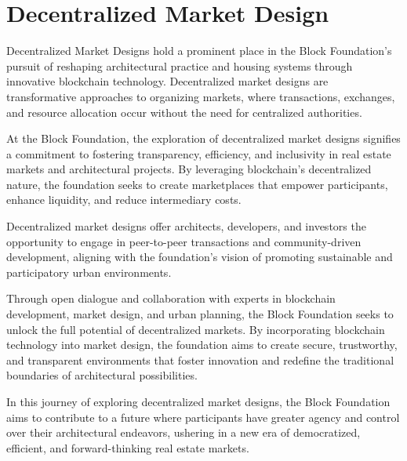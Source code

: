 \section{Decentralized Market Design}


Decentralized Market Designs hold a prominent place in the Block Foundation's pursuit of reshaping architectural practice and housing systems through innovative blockchain technology. Decentralized market designs are transformative approaches to organizing markets, where transactions, exchanges, and resource allocation occur without the need for centralized authorities.

At the Block Foundation, the exploration of decentralized market designs signifies a commitment to fostering transparency, efficiency, and inclusivity in real estate markets and architectural projects. By leveraging blockchain's decentralized nature, the foundation seeks to create marketplaces that empower participants, enhance liquidity, and reduce intermediary costs.

Decentralized market designs offer architects, developers, and investors the opportunity to engage in peer-to-peer transactions and community-driven development, aligning with the foundation's vision of promoting sustainable and participatory urban environments.

Through open dialogue and collaboration with experts in blockchain development, market design, and urban planning, the Block Foundation seeks to unlock the full potential of decentralized markets. By incorporating blockchain technology into market design, the foundation aims to create secure, trustworthy, and transparent environments that foster innovation and redefine the traditional boundaries of architectural possibilities.

In this journey of exploring decentralized market designs, the Block Foundation aims to contribute to a future where participants have greater agency and control over their architectural endeavors, ushering in a new era of democratized, efficient, and forward-thinking real estate markets.